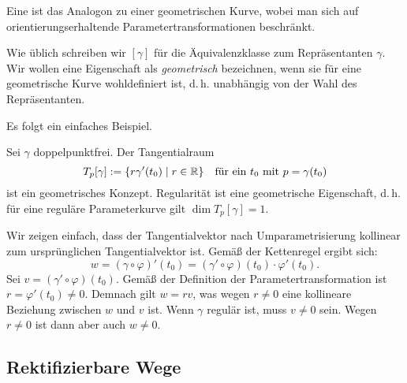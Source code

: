 \begin{definition}
Eine  ist das Analogon zu einer
geometrischen Kurve, wobei man sich auf orientierungserhaltende
Parametertransformationen beschränkt.
\end{definition}

\noindent
Wie üblich schreiben wir $[\gamma]$ für die Äquivalenzklasse zum
Repräsentanten $\gamma$. Wir wollen eine Eigenschaft als
\emph{geometrisch} bezeichnen, wenn sie für eine geometrische Kurve
wohldefiniert ist, d.\,h. unabhängig von der Wahl des Repräsentanten.

Es folgt ein einfaches Beispiel.

\begin{corollary}
Sei $\gamma$ doppelpunktfrei. Der Tangentialraum
\begin{equation}
T_p[\gamma] := \{r\gamma'(t_0)\mid r\in\mathbb R\}
\quad\text{für ein $t_0$ mit $p=\gamma(t_0)$}
\end{equation}
ist ein geometrisches Konzept. Regularität ist eine geometrische
Eigenschaft, d.\,h. für eine reguläre Parameterkurve gilt
$\dim T_p[\gamma]=1$.
\end{corollary}

\noindent{}
Wir zeigen einfach, dass der Tangentialvektor nach Umparametrisierung
kollinear zum ursprünglichen Tangentialvektor ist. Gemäß der
Kettenregel ergibt sich:%
\begin{equation}
w = (\gamma\circ\varphi)'(t_0) = (\gamma'\circ\varphi)(t_0)\cdot \varphi'(t_0).
\end{equation}
Sei $v=(\gamma'\circ\varphi)(t_0)$. Gemäß der Definition der
Parametertransformation ist $r=\varphi'(t_0)\ne 0$. Demnach
gilt $w=rv$, was wegen $r\ne 0$ eine kollineare Beziehung zwischen
$w$ und $v$ ist. Wenn $\gamma$ regulär ist, muss $v\ne 0$ sein.
Wegen $r\ne 0$ ist dann aber auch $w\ne 0$.\;\qedsymbol


\subsection{Rektifizierbare Wege}

